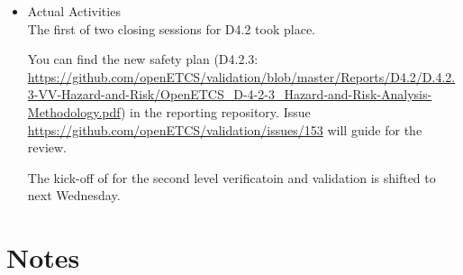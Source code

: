 \documentclass[a4paper, 11pt]{article}
\begin{document}
\begin{itemize}
\item Actual Activities\\
The first of two closing sessions for D4.2 took place.

You can find the new safety plan (D4.2.3: \url{https://github.com/openETCS/validation/blob/master/Reports/D4.2/D.4.2.3-VV-Hazard-and-Risk/OpenETCS_D-4-2-3_Hazard-and-Risk-Analysis-Methodology.pdf}) in the reporting repository. Issue \url{https://github.com/openETCS/validation/issues/153} will guide for the review. 

The kick-off of for the second level verificatoin and validation is shifted to next Wednesday.

\end{itemize}

\section{Notes}
\end{document}

